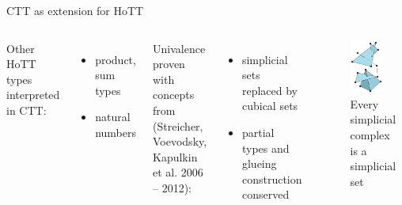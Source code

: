 \documentclass[english,handout]{beamer}
\begin{document}
\begin{frame}{CTT as extension for HoTT}{}
 


 \begin{columns}[c]
         Other HoTT types interpreted in CTT:
 \begin{itemize}
  \item product, sum types
  \item natural numbers
 \end{itemize}
 
        Univalence proven with concepts from (Streicher, Voevodsky, Kapulkin et al. 2006 -- 2012):
        \begin{itemize}
        \item simplicial sets replaced by cubical sets
        \item partial types and glueing construction conserved
       \end{itemize}
        \begin{figure}
       \includegraphics[width=0.7\textwidth]{figures/simplex}
       \caption{Every simplicial complex is a simplicial set}
       \end{figure}
\end{columns}
 
\end{frame}
\end{document}
